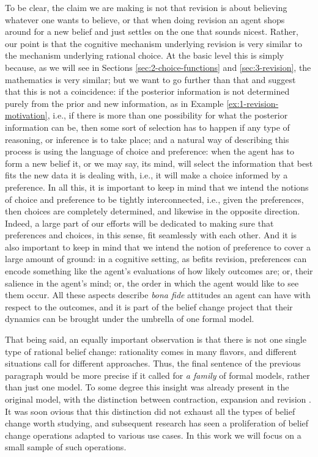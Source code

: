 To be clear, the claim we are making is not that 
revision is about believing whatever one wants to believe,
or that when doing revision
an agent shops around for a new belief and just settles on 
the one that sounds nicest.
Rather, our point is that the cognitive mechanism underlying 
revision is very similar to the mechanism underlying rational choice.
At the basic level this is simply because, as we will see in 
Sections \ref{sec:2-choice-functions} and \ref{sec:3-revision},
the mathematics is very similar; but we want to go further than that 
and suggest that this is not a coincidence: if the posterior 
information is not determined purely from the prior and new information,
as in Example \ref{ex:1-revision-motivation},
i.e., if there is more than one possibility for what the posterior 
information can be,
then some sort of selection has to happen
if any type of reasoning, or inference is to take place;
and a natural way of describing this process is 
using the language of choice and preference:
when the agent has to form a new belief it, or we may say, its mind,
will select the information that best fits the new data 
it is dealing with, i.e., it will make a choice informed by a preference.
In all this, it is important to keep in mind that we intend 
the notions of choice and preference to be tightly interconnected, 
i.e., given the preferences, then choices are completely determined,
and likewise in the opposite direction.
Indeed, a large part of our efforts will be dedicated to making sure 
that preferences and choices, in this sense, fit seamlessly with each other.
And it is also important to keep in mind that 
we intend the notion of preference to cover a large amount of ground:
in a cognitive setting, as befits revision,
preferences can encode something like the agent's evaluations of 
how likely outcomes are; or, their salience in the agent's mind;
or, the order in which the agent would like to see them occur.
All these aspects describe \emph{bona fide} attitudes an agent can have 
with respect to the outcomes, and it is part of the belief change project
that their dynamics can be brought under the umbrella of one formal model.

That being said, an equally important observation is that there is not 
one single type of rational belief change:
rationality comes in many flavors, and different situations 
call for different approaches.
Thus, the final sentence of the previous paragraph 
would be more precise if it called for \emph{a family} of 
formal models, rather than just one model.
To some degree this insight was already present 
in the original model, with the distinction 
between contraction, expansion and revision
\cite{AlchourronGM85,Gardenfors88}.
It was soon ovious that this distinction did 
not exhaust all the types of belief change worth studying,
and subsequent research has seen a proliferation
of belief change operations adapted to various use cases.
In this work we will focus on a small sample of such operations.

